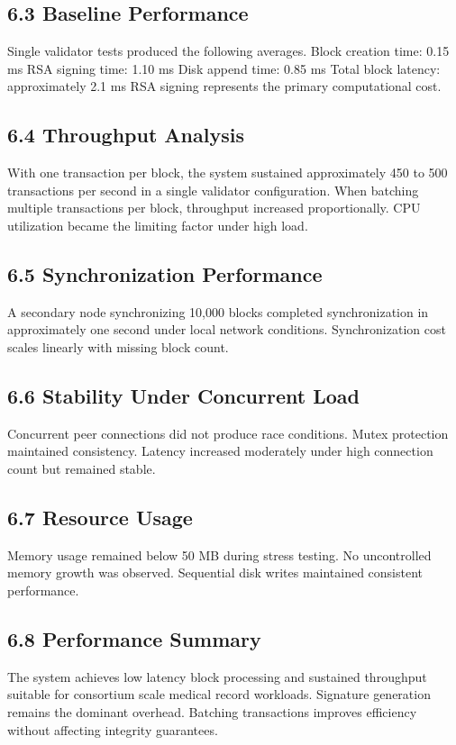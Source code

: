 \subsection*{6.3 Baseline Performance}
Single validator tests produced the following averages.
Block creation time: 0.15 ms
RSA signing time: 1.10 ms
Disk append time: 0.85 ms
Total block latency: approximately 2.1 ms
RSA signing represents the primary computational cost.

\subsection*{6.4 Throughput Analysis}
With one transaction per block, the system sustained approximately 450 to 500 transactions per second in a single validator configuration.
When batching multiple transactions per block, throughput increased proportionally. CPU utilization became the limiting factor under high load.



\subsection*{6.5 Synchronization Performance}
A secondary node synchronizing 10,000 blocks completed synchronization in approximately one second under local network conditions.
Synchronization cost scales linearly with missing block count.

\subsection*{6.6 Stability Under Concurrent Load}
Concurrent peer connections did not produce race conditions. Mutex protection maintained consistency. Latency increased moderately under high connection count but remained stable.

\subsection*{6.7 Resource Usage}
Memory usage remained below 50 MB during stress testing. No uncontrolled memory growth was observed. Sequential disk writes maintained consistent performance.

\subsection*{6.8 Performance Summary}
The system achieves low latency block processing and sustained throughput suitable for consortium scale medical record workloads. Signature generation remains the dominant overhead. Batching transactions improves efficiency without affecting integrity guarantees.


